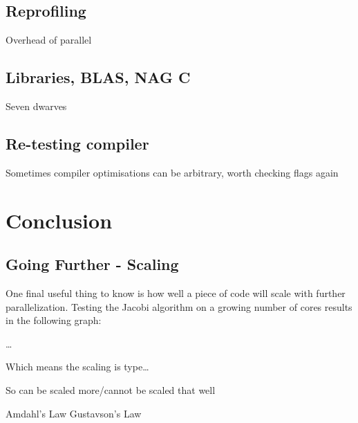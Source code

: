 \documentclass{article}
\begin{document}
\subsection{Reprofiling}
Overhead of parallel

\subsection{Libraries, BLAS, NAG C}
Seven dwarves

\subsection{Re-testing compiler}
Sometimes compiler optimisations can be arbitrary, worth checking flags again

\section{Conclusion}
\subsection{Going Further - Scaling}
One final useful thing to know is how well a piece of code will scale
with further parallelization. Testing the Jacobi algorithm on a growing number of
cores results in the following graph:

\ldots

Which means the scaling is type\ldots

So can be scaled more/cannot be scaled that well

Amdahl's Law Gustavson's Law
\end{document}
